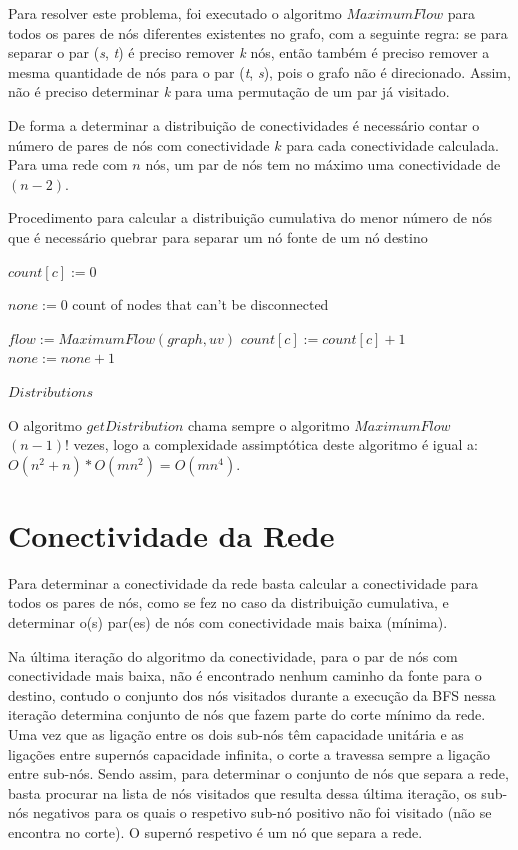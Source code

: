 \documentclass[12pt,a4paper]{article}
\begin{document}
Para resolver este problema, foi executado o algoritmo $MaximumFlow$ para todos os pares de nós diferentes existentes no grafo, com a seguinte regra: se para separar o par (\textit{s}, \textit{t}) é preciso remover \textit{k} nós, então também é preciso remover a mesma quantidade de nós para o par (\textit{t}, \textit{s}), pois o grafo não é direcionado. Assim, não é preciso determinar \textit{k} para uma permutação de um par já visitado.

De forma a determinar a distribuição de conectividades é necessário contar o número de pares de nós com conectividade $k$ para cada conectividade calculada. Para uma rede com $n$ nós, um par de nós tem no máximo uma conectividade de $(n - 2)$. 

\begin{algorithm}
\caption{Procedimento para calcular a distribuição cumulativa do menor número de nós que é necessário quebrar para separar um nó fonte de um nó destino}\label{alg:distribution}
\begin{algorithmic}[1]
    		\State $count[c] := 0$
    \EndFor
    
    \State $none := 0$ \Comment count of nodes that can't be disconnected
		
    		\State $flow := MaximumFlow(graph, uv)$
			\State $count[c] := count[c] + 1$
		\Else
			\State $none := none + 1$
		\EndIf
    \EndFor
    	
  	\Return $Distributions$
\EndProcedure
\end{algorithmic}
\end{algorithm}

O algoritmo $getDistribution$ chama sempre o algoritmo $MaximumFlow$ $(n-1)!$ vezes, logo a complexidade assimptótica deste algoritmo é igual a: $O(n^2 + n) * O(m n^2) = O(m n^4)$.

\section{Conectividade da Rede}

Para determinar a conectividade da rede basta calcular a conectividade para todos os pares de nós, como se fez no caso da distribuição cumulativa, e determinar o(s) par(es) de nós com conectividade mais baixa (mínima).

Na última iteração do algoritmo da conectividade, para o par de nós com conectividade mais baixa, não é encontrado nenhum caminho da fonte para o destino, contudo o conjunto dos nós visitados durante a execução da BFS nessa iteração determina conjunto de nós que fazem parte do corte mínimo da rede. Uma vez que as ligação entre os dois sub-nós têm capacidade unitária e as ligações entre supernós capacidade infinita, o corte a travessa sempre a ligação entre sub-nós. Sendo assim, para determinar o conjunto de nós que separa a rede, basta procurar na lista de nós visitados que resulta dessa última iteração, os sub-nós negativos para os quais o respetivo sub-nó positivo não foi visitado (não se encontra no corte). O supernó respetivo é um nó que separa a rede.
\end{document}
